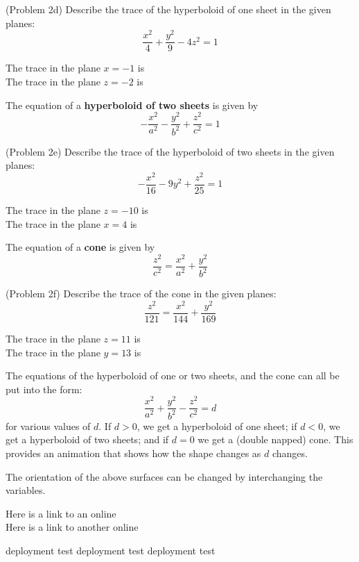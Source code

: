 \documentclass[handout]{ximera}
\begin{document}
\begin{problem}(Problem 2d)
Describe the trace of the hyperboloid of one sheet in the given planes:
\[
\frac{x^2}{4} + \frac{y^2}{9} - 4z^2 = 1
\]

The trace in the plane $x = -1$ is \\
The trace in the plane $z = -2$ is \\
\end{problem}

The equation of a \textbf{hyperboloid of two sheets} is given by 
\[
-\frac{x^2}{a^2} -\frac{y^2}{b^2} + \frac{z^2}{c^2} = 1
\]


\begin{problem}(Problem 2e)
Describe the trace of the hyperboloid of two sheets in the given planes:
\[
-\frac{x^2}{16} - 9y^2 + \frac{z^2}{25} = 1
\]

The trace in the plane $z = -10$ is \\
The trace in the plane $x = 4$ is 
\end{problem}



The equation of a \textbf{cone} is given by 
\[
\frac{z^2}{c^2} = \frac{x^2}{a^2} + \frac{y^2}{b^2}
\]

\begin{problem}(Problem 2f)
Describe the trace of the cone in the given planes:
\[
\frac{z^2}{121} = \frac{x^2}{144} + \frac{y^2}{169}
\]

The trace in the plane $z = 11$ is \\
The trace in the plane $y = 13$ is 
\end{problem}


The equations of the hyperboloid of one or two sheets, and the cone can all be put into the form:
\[
 \frac{x^2}{a^2} + \frac{y^2}{b^2} - \frac{z^2}{c^2} = d
\]
for various values of $d$.  If $d > 0$, we get a hyperboloid of one sheet; if $d< 0$, we get a 
hyperboloid of two sheets; and if $d= 0$ we get a (double napped) cone.
This  provides an 
animation that shows how the shape changes as $d$ changes.\\


\begin{remark}
The orientation of the above surfaces can be changed by interchanging the variables.
\end{remark}

Here is a link to an online \\
Here is a link to another online 

deployment test
deployment test
deployment test
\end{document}
